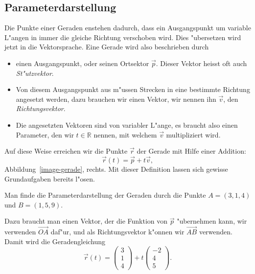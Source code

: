 \subsection{Parameterdarstellung}
Die Punkte einer Geraden enstehen dadurch, dass ein Ausgangspunkt um
variable L"angen in immer die gleiche Richtung verschoben wird. Dies "ubersetzen
wird jetzt in die Vektorsprache. Eine Gerade wird also beschrieben durch
\begin{itemize}
\item einen Ausgangspunkt, oder seinen Ortsektor $\vec p$. Dieser Vektor
heisst oft auch {\em St"utzvektor}.
\item Von diesem Ausgangspunkt aus m"ussen Strecken in eine bestimmte
Richtung angesetzt werden, dazu brauchen wir einen Vektor, wir nennen ihn
$\vec v$, den {\em Richtungsvektor}.
\item Die angesetzten Vektoren sind von variabler L"ange, es braucht also
einen Parameter, den wir $t\in \mathbb R$ nennen, mit welchem $\vec v$
multipliziert wird.
\end{itemize}
Auf diese Weise erreichen wir die Punkte $\vec r$ der Gerade mit Hilfe
einer Addition:
\[
\vec r(t)=\vec p+t\vec v,
\]
Abbildung~\ref{image-gerade}, rechts.
Mit dieser Definition lassen sich gewisse Grundaufgaben bereits l"osen.

\begin{beispiel}
Man finde die Parameterdarstellung der Geraden durch die Punkte
$A=(3,1,4)$ und $B=(1,5,9)$.

\smallskip

{\parindent 0pt
Dazu} braucht man einen Vektor, der die Funktion von $\vec p$ "ubernehmen
kann, wir verwenden $\overrightarrow{OA}$ daf"ur, und als
Richtungsvektor k"onnen wir $\overrightarrow{AB}$ verwenden. Damit wird
die Geradengleichung
\begin{equation}
\vec r(t) =
\begin{pmatrix}3\\1\\4 \end{pmatrix}
+t
\begin{pmatrix}-2\\4\\5\end{pmatrix}.
\label{pigerade}
\end{equation}
\end{beispiel}

